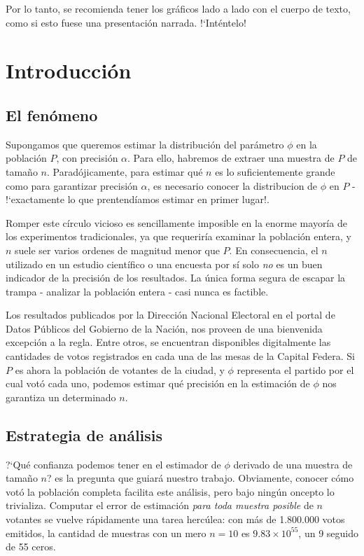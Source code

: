 \documentclass[12pt, a4paper]{article}
\begin{document}
Por lo tanto, se recomienda tener los gr\'aficos lado a lado con el cuerpo de texto, como si esto fuese una presentaci\'on narrada. !`Int\'entelo!

\section{Introducci\'on}

\subsection{El fen\'omeno}

Supongamos que queremos estimar la distribuci\'on del par\'ametro $\phi$ en la poblaci\'on $P$, con precisi\'on $\alpha$. Para ello, habremos de extraer una muestra de $P$ de tama\~no $n$. Parad\'ojicamente, para estimar qu\'e $n$ es lo suficientemente grande como para garantizar precisi\'on $\alpha$, es necesario conocer la distribucion de $\phi$ en $P$ - !`exactamente lo que prentend\'iamos estimar en primer lugar!.

Romper este c\'irculo vicioso es sencillamente imposible en la enorme mayor\'ia de los experimentos tradicionales, ya que requerir\'ia examinar la poblaci\'on entera, y $n$ suele ser varios ordenes de magnitud menor que $P$. En consecuencia, el $n$ utilizado en un estudio cient\'ifico o una encuesta por s\'i solo \emph{no} es un buen indicador de la precisi\'on de los resultados. La \'unica forma segura de escapar la trampa - analizar la poblaci\'on entera - casi nunca es factible.

Los resultados publicados por la Direcci\'on Nacional Electoral en el portal de Datos P\'ublicos del Gobierno de la Naci\'on, nos proveen de una bienvenida excepci\'on a la regla. Entre otros, se encuentran disponibles digitalmente las cantidades de votos registrados en cada una de las mesas de la Capital Federa. Si $P$ es ahora la poblaci\'on de votantes de la ciudad, y $\phi$ representa el partido por el cual vot\'o cada uno, podemos estimar qu\'e precisi\'on en la estimaci\'on de $\phi$ nos garantiza un determinado $n$.

\subsection{Estrategia de an\'alisis}
?`Qu\'e confianza podemos tener en el estimador de $\phi$ derivado de una muestra de tama\~no $n$? es la pregunta que guiar\'a nuestro trabajo. Obviamente, conocer c\'omo vot\'o la poblaci\'on completa facilita este an\'alisis, pero bajo ning\'un oncepto lo trivializa. Computar el error de estimaci\'on \emph{para toda muestra posible} de $n$ votantes se vuelve r\'apidamente una tarea herc\'ulea: con m\'as de 1.800.000 votos emitidos, la cantidad de muestras con un mero $n=10$ es $9.83 \times 10^{55}$, un 9 seguido de 55 ceros.
\end{document}

